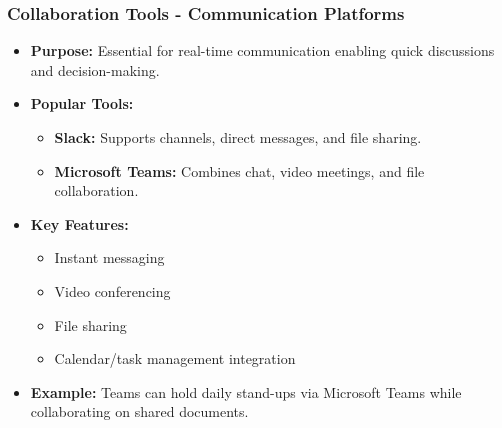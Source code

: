 \documentclass[aspectratio=169]{beamer}
\begin{document}
\begin{frame}[fragile]
    \frametitle{Collaboration Tools - Communication Platforms}
    \begin{itemize}
        \item \textbf{Purpose:} Essential for real-time communication enabling quick discussions and decision-making.
        
        \item \textbf{Popular Tools:}
            \begin{itemize}
                \item \textbf{Slack:} Supports channels, direct messages, and file sharing.
                \item \textbf{Microsoft Teams:} Combines chat, video meetings, and file collaboration.
            \end{itemize}
        
        \item \textbf{Key Features:}
            \begin{itemize}
                \item Instant messaging
                \item Video conferencing
                \item File sharing
                \item Calendar/task management integration
            \end{itemize}
        
        \item \textbf{Example:} Teams can hold daily stand-ups via Microsoft Teams while collaborating on shared documents.
    \end{itemize}
\end{frame}
\end{document}
